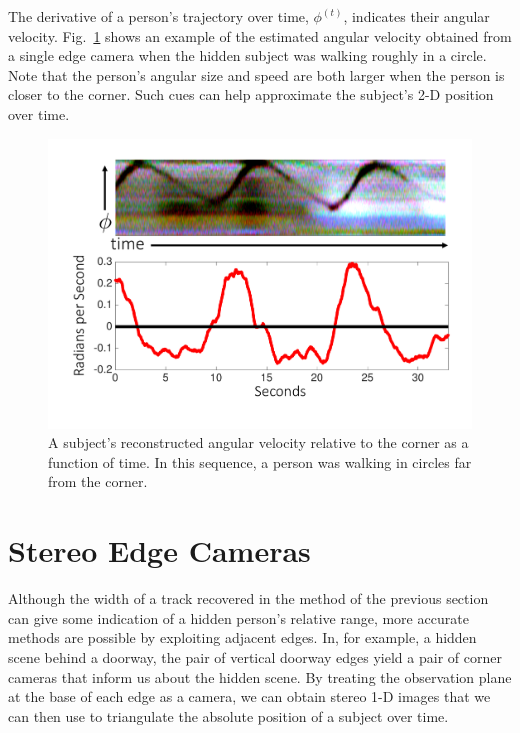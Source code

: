 The derivative of a person's trajectory over time, $\phi^{(t)}$, indicates their angular velocity. Fig.~\ref{fig:angularvelocity} shows an example of the estimated angular velocity obtained from a single edge camera when the hidden subject was walking roughly in a circle. Note that the person's angular size and speed are both larger when the person is closer to the corner. Such cues can help approximate the subject's 2-D position over time. 


\begin{figure}[!htb]
\centering
\includegraphics[width=0.75\linewidth]{figs/angularvelocity.pdf}
\caption{A subject's reconstructed angular velocity relative to the corner as a function of time. In this sequence, a person was walking in circles far from the corner. \label{fig:angularvelocity} }
\vspace{-.2in}
\end{figure}


\section{Stereo Edge Cameras \label{sec:methods_stereo}}




Although the width of a track recovered in the method of the previous section can give some indication of a hidden person's relative range, more accurate methods are possible by exploiting adjacent edges.  In, for example, a hidden scene behind a doorway, the pair of vertical doorway edges yield a pair of corner cameras that inform us about the hidden scene. By treating the observation plane at the base of each edge as a camera, we can obtain stereo 1-D images that we can then use to triangulate the absolute position of a subject over time. 




